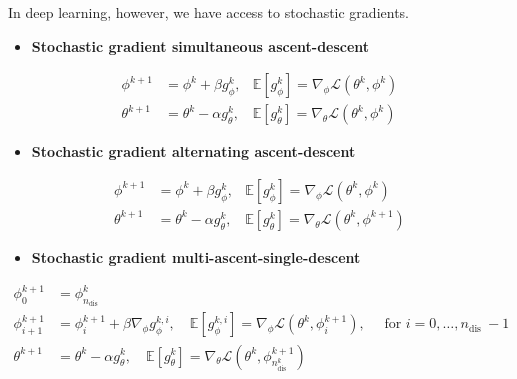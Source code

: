\begin{definition}
    In deep learning, however, we have access to stochastic gradients.

    \begin{itemize}
        \item \textbf{Stochastic gradient simultaneous ascent-descent}
    \end{itemize}

    $$
    \begin{aligned}
    \phi^{k+1} & =\phi^{k}+\beta g_{\phi}^{k}, & \mathbb{E}\left[g_{\phi}^{k}\right]=\nabla_{\phi} \mathcal{L}\left(\theta^{k}, \phi^{k}\right) \\
    \theta^{k+1} & =\theta^{k}-\alpha g_{\theta}^{k}, & \mathbb{E}\left[g_{\theta}^{k}\right]=\nabla_{\theta} \mathcal{L}\left(\theta^{k}, \phi^{k}\right)
    \end{aligned}
    $$

    \begin{itemize}
        \item \textbf{Stochastic gradient alternating ascent-descent}
    \end{itemize}

    $$
    \begin{aligned}
    \phi^{k+1} & =\phi^{k}+\beta g_{\phi}^{k}, & \mathbb{E}\left[g_{\phi}^{k}\right]=\nabla_{\phi} \mathcal{L}\left(\theta^{k}, \phi^{k}\right) \\
    \theta^{k+1} & =\theta^{k}-\alpha g_{\theta}^{k}, & \mathbb{E}\left[g_{\theta}^{k}\right]=\nabla_{\theta} \mathcal{L}\left(\theta^{k}, \phi^{k+1}\right)
    \end{aligned}
    $$

    \begin{itemize}
        \item \textbf{Stochastic gradient multi-ascent-single-descent}
    \end{itemize}

    $$
    \begin{aligned}
    \phi_{0}^{k+1} & =\phi_{n_{\text {dis }}}^{k} \\
    \phi_{i+1}^{k+1} & =\phi_{i}^{k+1}+\beta \nabla_{\phi} g_{\phi}^{k, i}, \quad \mathbb{E}\left[g_{\phi}^{k, i}\right]=\nabla_{\phi} \mathcal{L}\left(\theta^{k}, \phi_{i}^{k+1}\right), \quad \text { for } i=0, \ldots, n_{\text {dis }}-1 \\
    \theta^{k+1} & =\theta^{k}-\alpha g_{\theta}^{k}, \quad \mathbb{E}\left[g_{\theta}^{k}\right]=\nabla_{\theta} \mathcal{L}\left(\theta^{k}, \phi_{n_{\text {dis }}^{k}}^{k+1}\right)
    \end{aligned}
    $$
\end{definition}

